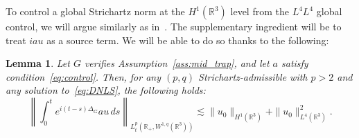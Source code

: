 \documentclass[10pt]{amsart}
\newtheorem{lemm}[theo]{Lemma}\newtheorem{prop}[theo]{Proposition}\newtheorem{coro}[theo]{Corollary}\newtheorem{conj}[theo]{Conjecture}
\theoremstyle{definition}\newtheorem{defi}[theo]{Definition}\newtheorem{rema}[theo]{Remark}\newtheorem{exam}[theo]{Example}\newtheorem{exem}[theo]{Example}\newtheorem{nota}[theo]{Notation}
\newcommand*\R{\mathbb{R}}
\begin{document}
To control a global Strichartz norm at the $H^1(\R ^3)$ level from the $L^4 L^4$ global control, we will argue similarly as in~\cite{CoKeStTaTa04}. The supplementary ingredient will be to treat $iau$ as a source term. We will be able to do so thanks to the following:

\begin{lemm}
Let $G$ verifies Assumption~\ref{ass:mid_trap}, and let $a$ satisfy condition~\eqref{eq:control}. Then, for any $(p,q)$ Strichartz-admissible with $p>2$ and any solution to~\eqref{eq:DNLS}, the following holds:
\begin{equation}\label{eqB}
\left\| \int_0^t e^{i(t-s)\Delta_G} a u \, ds \right\|_{L_t^p\left(\R_+, W^{1,q}(\R^3)\right)} \lesssim \| u_0 \|_{H^1(\R^3)} + \| u_0 \|^2_{L^4(\R^3)}.
\end{equation}
\end{lemm}
\end{document}
